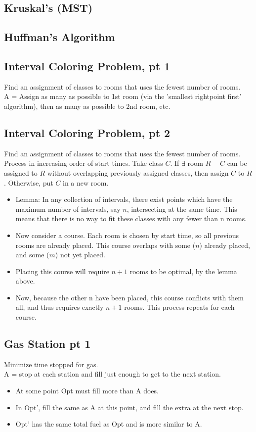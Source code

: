 \documentclass[12pt]{article}
\providecommand{\st}{\ \text{s.t.}\ }
\providecommand{\tightlist}{
    \setlength{\itemsep}{0pt}\setlength{\parskip}{0pt}
}
\begin{document}
\subsection{Kruskal's (MST)}


\subsection{Huffman's Algorithm}



\subsection{Interval Coloring Problem, pt 1}
Find an assignment of classes to rooms that uses the fewest number of rooms.\\
A = Assign as many as possible to 1st room (via the 'smallest rightpoint first' algorithm), then as many as possible to 2nd room, etc.


\subsection{Interval Coloring Problem, pt 2}
Find an assignment of classes to rooms that uses the fewest number of rooms.\\
Process in increasing order of start times. Take class $C$. If $\exists$ room $R$ \st $C$ can be assigned to $R$ without overlapping previously assigned classes, then assign $C$ to $R$. Otherwise, put $C$ in a new room.
\begin{itemize}\tightlist
  \item Lemma: In any collection of intervals, there exist points which have the maximum number of intervals, say $n$, intersecting at the same time. This means that there is no way to fit these classes with any fewer than n rooms.
  \item Now consider a course. Each room is chosen by start time, so all previous rooms are already placed.
	This course overlaps with some ($n$) already placed, and some ($m$) not yet placed.
	\item Placing this course will require $n+1$ rooms to be optimal, by the lemma above.
	\item Now, because the other n have been placed, this course conflicts with them all, and thus requires exactly $n+1$ rooms. This process repeats for each course.
\end{itemize}


\subsection{Gas Station pt 1}
Minimize time stopped for gas.\\
A = stop at each station and fill just enough to get to the next station.
\begin{itemize}
  \item At some point Opt must fill more than A does.
  \item In Opt', fill the same as A at this point, and fill the extra at the next stop.
  \item Opt' has the same total fuel as Opt and is more similar to A.
\end{itemize}
\end{document}
